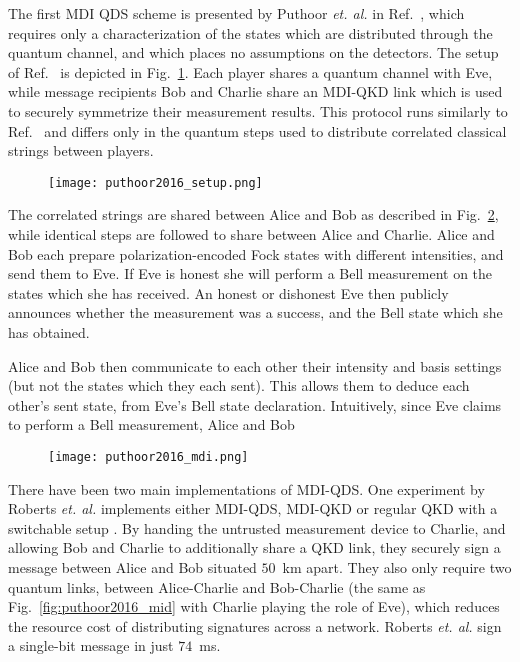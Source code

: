 The first MDI QDS scheme is presented by Puthoor \emph{et. al.} in Ref.~\cite{Puthoor2016}, which requires only a characterization of the states which are distributed through the quantum channel, and which places no assumptions on the detectors. The setup of Ref.~\cite{Puthoor2016} is depicted in Fig.~\ref{fig:puthoor2016_setup}. Each player shares a quantum channel with Eve, while message recipients Bob and Charlie share an MDI-QKD link which is used to securely symmetrize their measurement results. This protocol runs similarly to Ref.~\cite{Amiri2016} and differs only in the quantum steps used to distribute correlated classical strings between players. 

\begin{figure}[htp]
\centering
\texttt{[image: puthoor2016\_setup.png]}
\caption{\label{fig:puthoor2016_setup}}
\end{figure}

The correlated strings are shared between Alice and Bob as described in Fig.~\ref{fig:puthoor2016_mdi}, while identical steps are followed to share between Alice and Charlie. Alice and Bob each prepare polarization-encoded Fock states with different intensities, and send them to Eve. If Eve is honest she will perform a Bell measurement  on the states which she has received. An honest or dishonest Eve then publicly announces whether the measurement was a success, and the Bell state which she has obtained.

Alice and Bob then communicate to each other their intensity and basis settings (but not the states which they each sent). This allows them to deduce each other's sent state, from Eve's Bell state declaration. Intuitively, since Eve claims to perform a Bell measurement, Alice and Bob 

\begin{figure}[htp]
\centering
\texttt{[image: puthoor2016\_mdi.png]}
\caption{\label{fig:puthoor2016_mdi}}
\end{figure}


There have been two main implementations of MDI-QDS. One experiment by Roberts \emph{et. al.} implements either MDI-QDS, MDI-QKD or regular QKD with a switchable setup \cite{Roberts2017}. By handing the untrusted measurement device to Charlie, and allowing Bob and Charlie to additionally share a QKD link, they securely sign a message between Alice and Bob situated $50$~km apart. They also only require two quantum links, between Alice-Charlie and Bob-Charlie (the same as Fig.~\ref{fig:puthoor2016_mid} with Charlie playing the role of Eve), which reduces the resource cost of distributing signatures across a network. Roberts \emph{et. al.} sign a single-bit message in just $74$~ms. 




